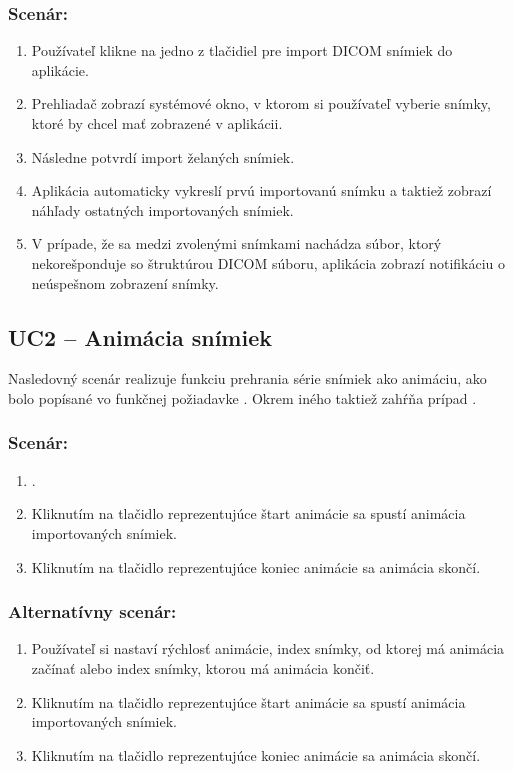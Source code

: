 \subsubsection*{Scenár:}
\begin {enumerate}
\item {Používateľ klikne na jedno z tlačidiel pre import DICOM snímiek do aplikácie.}
\item {Prehliadač zobrazí systémové okno, v ktorom si používateľ vyberie snímky, ktoré by chcel mať zobrazené v aplikácii.}
\item {Následne potvrdí import želaných snímiek.}
\item {Aplikácia automaticky vykreslí prvú importovanú snímku a taktiež zobrazí náhľady ostatných importovaných snímiek.}
\item {V prípade, že sa medzi zvolenými snímkami nachádza súbor, ktorý nekorešponduje so štruktúrou DICOM súboru, aplikácia zobrazí notifikáciu o neúspešnom zobrazení snímky.}
\end {enumerate}
	
\subsection {UC2 -- Animácia snímiek}\label{uc2}
Nasledovný scenár realizuje funkciu prehrania série snímiek ako animáciu, ako bolo popísané vo funkčnej požiadavke .
Okrem iného taktiež zahŕňa prípad . 

\subsubsection*{Scenár:}
\begin {enumerate}
\item {.}
\item {Kliknutím na tlačidlo reprezentujúce štart animácie sa spustí animácia importovaných snímiek.}
\item {Kliknutím na tlačidlo reprezentujúce koniec animácie sa animácia skončí.}
\end {enumerate}

\subsubsection*{Alternatívny scenár:}
\begin {enumerate}
\item [\textbf{2.}] {Používateľ si nastaví rýchlosť animácie, index snímky, od ktorej má animácia začínať alebo index snímky, ktorou má animácia končiť.}
\item  [\textbf{3.}] {Kliknutím na tlačidlo reprezentujúce štart animácie sa spustí animácia importovaných snímiek.}
\item  [\textbf{4.}] {Kliknutím na tlačidlo reprezentujúce koniec animácie sa animácia skončí.}
\end {enumerate}


